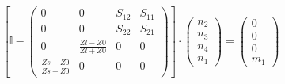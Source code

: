 \[ \left[ \mathbb{I}  - \left(\begin{array}{cccc} 0 & 0 & S_{12} &
S_{11} \\ 0 & 0 & S_{22} & S_{21} \\ 0 & \frac{ Zl -Z0}{ Zl +Z0} & 0 &
0 \\ \frac{ Zs -Z0}{ Zs +Z0} & 0 & 0 & 0 \end{array}\right)\right]
\cdot \left(\begin{array}{c} n_{2} \\ n_{3} \\ n_{4} \\ n_{1}
\end{array}\right) = \left(\begin{array}{c} 0 \\ 0 \\ 0 \\ m_{1}
\end{array}\right) \]
